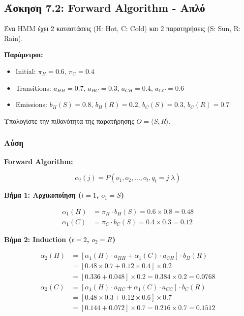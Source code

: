 \subsection{Άσκηση 7.2: Forward Algorithm - Απλό}

\begin{formulabox}[Εκφώνηση]
Ένα HMM έχει 2 καταστάσεις (H: Hot, C: Cold) και 2 παρατηρήσεις (S: Sun, R: Rain).

\textbf{Παράμετροι:}
\begin{itemize}
    \item Initial: $\pi_H = 0.6$, $\pi_C = 0.4$
    \item Transitions: $a_{HH} = 0.7$, $a_{HC} = 0.3$, $a_{CH} = 0.4$, $a_{CC} = 0.6$
    \item Emissions: $b_H(S) = 0.8$, $b_H(R) = 0.2$, $b_C(S) = 0.3$, $b_C(R) = 0.7$
\end{itemize}

Υπολογίστε την πιθανότητα της παρατήρησης $O = \langle S, R \rangle$.
\end{formulabox}

\subsubsection*{Λύση}

\textbf{Forward Algorithm:}

$$\alpha_t(j) = P(o_1, o_2, ..., o_t, q_t = j | \lambda)$$

\textbf{Βήμα 1: Αρχικοποίηση ($t=1$, $o_1 = S$)}

\begin{align*}
\alpha_1(H) &= \pi_H \cdot b_H(S) = 0.6 \times 0.8 = 0.48 \\
\alpha_1(C) &= \pi_C \cdot b_C(S) = 0.4 \times 0.3 = 0.12
\end{align*}

\textbf{Βήμα 2: Induction ($t=2$, $o_2 = R$)}

\begin{align*}
\alpha_2(H) &= \left[\alpha_1(H) \cdot a_{HH} + \alpha_1(C) \cdot a_{CH}\right] \cdot b_H(R) \\
&= [0.48 \times 0.7 + 0.12 \times 0.4] \times 0.2 \\
&= [0.336 + 0.048] \times 0.2 = 0.384 \times 0.2 = 0.0768 \\[5pt]
\alpha_2(C) &= \left[\alpha_1(H) \cdot a_{HC} + \alpha_1(C) \cdot a_{CC}\right] \cdot b_C(R) \\
&= [0.48 \times 0.3 + 0.12 \times 0.6] \times 0.7 \\
&= [0.144 + 0.072] \times 0.7 = 0.216 \times 0.7 = 0.1512
\end{align*}

